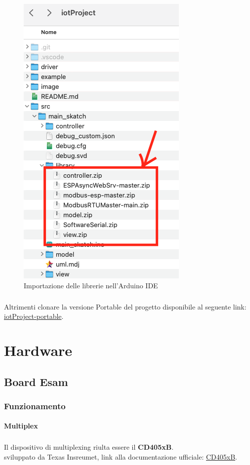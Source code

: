 \documentclass[12pt,a4paper]{report}
\begin{document}
\begin{figure}[H]
  \centering
  \includegraphics[width=0.3\linewidth]{../image/Library.png}
  \caption{Importazione delle librerie nell'Arduino IDE}
\end{figure}

\paragraph{} Altrimenti clonare la versione Portable del progetto disponibile al seguente link: \href{https://github.com/AlessioTommasi-supsi/iotProject/tree/portable}{iotProject-portable}.


\chapter{Hardware}
\section{Board Esam}
\subsection{Funzionamento}
\subsubsection{Multiplex}
\paragraph{ }
Il dispositivo di multiplexing riulta essere il \textbf{CD405xB}. \\
sviluppato da Texas Insreumet, link alla documentazione ufficiale: \href{https://www.ti.com/lit/ds/symlink/cd4051b.pdf}{CD405xB}. \\ 
\end{document}
